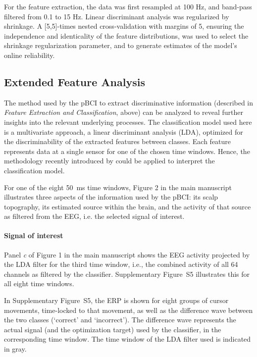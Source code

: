 For the feature extraction, the data was first resampled at 100 Hz, and band-pass filtered from 0.1 to 15 Hz. Linear discriminant analysis was regularized by shrinkage. A [5,5]-times nested cross-validation with margins of 5, ensuring the independence and identicality of the feature distributions, was used to select the shrinkage regularization parameter, and to generate estimates of the model's online reliability. 



\subsection*{Extended Feature Analysis}

The method used by the pBCI to extract discriminative information (described in \emph{Feature Extraction and Classification}, above) can be analyzed to reveal further insights into the relevant underlying processes. The classification model used here is a multivariate approach, a linear discriminant analysis (LDA), optimized for the discriminability of the extracted features between classes. Each feature represents data at a single sensor for one of the chosen time windows. Hence, the methodology recently introduced by  could be applied to interpret the classification model.

For one of the eight 50~ms time windows, Figure 2 in the main manuscript illustrates three aspects of the information used by the pBCI: its scalp topography, its estimated source within the brain, and the activity of that source as filtered from the EEG, i.e. the selected signal of interest.


\paragraph{Signal of interest} Panel \emph{c} of Figure 1 in the main manuscript shows the EEG activity projected by the LDA filter for the third time window, i.e., the combined activity of all 64 channels as filtered by the classifier. Supplementary Figure~S5 illustrates this for all eight time windows.

In Supplementary Figure~S5, the ERP is shown for eight groups of cursor movements, time-locked to that movement, as well as the difference wave between the two classes (`correct' and `incorrect'). The difference wave represents the actual signal (and the optimization target) used by the classifier, in the corresponding time window. The time window of the LDA filter used is indicated in gray.

